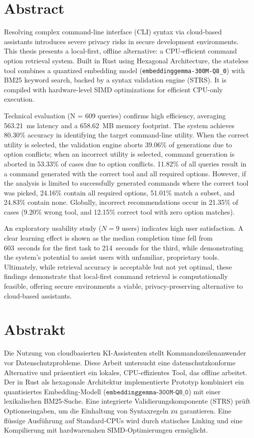 \section*{Abstract}

Resolving complex command-line interface (CLI) syntax via cloud-based assistants introduces severe privacy risks in secure development environments. This thesis presents a local-first, offline alternative: a CPU-efficient command option retrieval system. Built in Rust using Hexagonal Architecture, the stateless tool combines a quantized embedding model (\texttt{embeddinggemma-300M-Q8\_0}) with BM25 keyword search, backed by a syntax validation engine (STRS). It is compiled with hardware-level SIMD optimizations for efficient CPU-only execution. 

Technical evaluation (N = 609 queries) confirms high efficiency, averaging 563.21~ms latency and a 658.62~MB memory footprint. The system achieves 80.30\% accuracy in identifying the target command-line utility. When the correct utility is selected, the validation engine aborts 39.06\% of generations due to option conflicts; when an incorrect utility is selected, command generation is aborted in 53.33\% of cases due to option conflicts. 11.82\% of all queries result in a command generated with the correct tool and all required options. However, if the analysis is limited to successfully generated commands where the correct tool was picked, 24.16\% contain all required options, 51.01\% match a subset, and 24.83\% contain none. Globally, incorrect recommendations occur in 21.35\% of cases (9.20\% wrong tool, and 12.15\% correct tool with zero option matches). 

An exploratory usability study ($N=9$ users) indicates high user satisfaction. A clear learning effect is shown as the median completion time fell from 603~seconds for the first task to 214~seconds for the third, while demonstrating the system's potential to assist users with unfamiliar, proprietary tools. Ultimately, while retrieval accuracy is acceptable but not yet optimal, these findings demonstrate that local-first command retrieval is computationally feasible, offering secure environments a viable, privacy-preserving alternative to cloud-based assistants.

\newpage
\section*{Abstrakt}

Die Nutzung von cloudbasierten KI-Assistenten stellt Kommandozeilenanwender vor Datenschutzprobleme. Diese Arbeit untersucht eine datenschutzkonforme Alternative und präsentiert ein lokales, CPU-effizientes Tool, das offline arbeitet. Der in Rust als hexagonale Architektur implementierte Prototyp kombiniert ein quantisiertes Embedding-Modell ($\texttt{embeddinggemma-300M-Q8\_0}$) mit einer lexikalischen BM25-Suche. Eine integrierte Validierungskomponente (STRS) prüft Optionseingaben, um die Einhaltung von Syntaxregeln zu garantieren. Eine flüssige Ausführung auf Standard-CPUs wird durch statisches Linking und eine Kompilierung mit hardwarenahen SIMD-Optimierungen ermöglicht.

